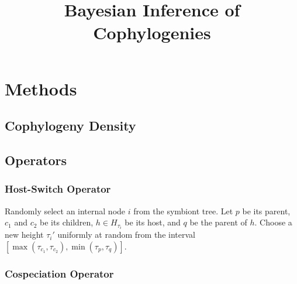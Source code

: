 \documentclass{article}
\title{Bayesian Inference of Cophylogenies}
\begin{document}
    \section*{Methods}
        
        \subsection*{Cophylogeny Density}

        \subsection*{Operators}
            
            \subsubsection*{Host-Switch Operator}
                
                Randomly select an internal node $i$ from the symbiont tree. 
                Let $p$ be its parent, $c_1$ and $c_2$ be its children, $h \in 
                H_{\tau_i}$ be its host, and $q$ be the parent of $h$. Choose a 
                new height $\tau_i\prime$ uniformly at random from the 
                interval $\left[\max\left(\tau_{c_1},\tau_{c_2}\right), 
                \min\left(\tau_p,\tau_q\right)\right]$.
                

            \subsubsection*{Cospeciation Operator}
    
\end{document}
